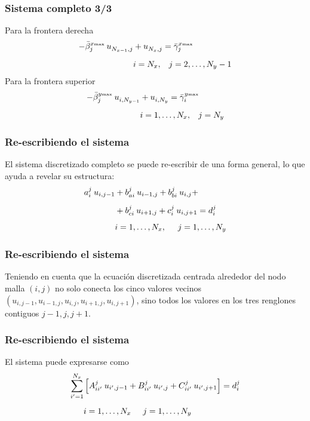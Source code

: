 \begin{frame}
\frametitle{Sistema completo 3/3}
Para la frontera derecha
\begin{align}
- \bar{\beta}_{j}^{x {\text{\tiny{max}}}} \:  u^{}_{N_{x-1}, j} &+ u^{}_{N_{x},j}  =  \bar{\gamma}_{j}^{x {\text{\tiny{max}}}} \\[0.5em]
&i = N_{x}, \hspace{0.3cm} j = 2, \ldots, N_{y} - 1
\label{eq:ecuacion_13_12}
\end{align}
\pause
Para la frontera superior
\begin{align}
- \bar{\beta}_{j}^{y {\text{\tiny{max}}}} \: u^{}_{i, N_{y-1}} &+ u^{}_{i, N_{y}}  =  \bar{\gamma}_{i}^{y {\text{\tiny{max}}}} \\[0.5em]
&i = 1, \ldots, N_{x}, \hspace{0.3cm} j = N_{y}
\label{eq:ecuacion_13_13}
\end{align}
\end{frame}
\begin{frame}
\frametitle{Re-escribiendo el sistema}
El sistema discretizado completo se puede re-escribir de una forma general, lo que ayuda a revelar su estructura:
\begin{align}
\begin{aligned}
a_{i}^{j} \: u_{i, j-1} &+ b_{ai}^{j} \: u_{i-1, j} + b_{bi}^{j} \: u_{i, j} + \\[0.5em]
&+ b_{ci}^{j} \: u_{i+1, j} + c_{i}^{j} \: u_{i, j+1} = d_{i}^{j} \\[0.5em]
&i = 1, \ldots, N_{x}, \hspace{0.5cm} j = 1, \ldots, N_{y}
\end{aligned}
\label{eq:ecuacion_13_14}
\end{align}
\end{frame}
\begin{frame}
\frametitle{Re-escribiendo el sistema}
Teniendo en cuenta que la ecuación discretizada centrada alrededor del nodo malla $(i, j)$ no solo conecta los cinco valores vecinos $(u_{i, j-1}, u_{i-1, j}, u_{i,j}, u_{i+1, j}, u_{i, j+1})$, sino todos los valores en los tres renglones contiguos $j-1, j, j+1$.
\end{frame}
\begin{frame}
\frametitle{Re-escribiendo el sistema}
 El sistema puede expresarse como
\begin{align}
\begin{aligned}
\sum_{i^{\prime} = 1}^{N_{x}} &\left[ A_{ii^{\prime}}^{j} \: u_{i^{\prime}, j-1} + B_{ii^{\prime}}^{j} \: u_{i^{\prime}, j} + C_{ii^{\prime}}^{j} \: u_{i^{\prime}, j+1}  \right] = d_{i}^{j} \\[0.5em]
&i = 1, \ldots, N_{x} \hspace{0.5cm} j = 1, \ldots, N_{y}
\end{aligned}
\label{eq:ecuacion_13_15}
\end{align}
\end{frame}
